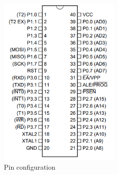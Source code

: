 \documentclass[a4paper]{article}
\begin{document}
\begin{figure}[h!]
\centering
\includegraphics[width=6cm]{images/atmel_pins.PNG}
\caption*{Pin configuration}
\end{figure}
\end{document}

